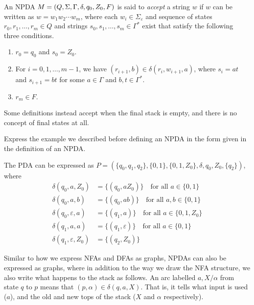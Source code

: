 \begin{definition}
An NPDA $M=(Q,\Sigma,\Gamma,\delta,q_0,Z_0,F)$ is said to \textit{accept} a string $w$ if $w$ can be written as $w=w_1w_2\cdots w_m$, where each $w_i\in\Sigma_\varepsilon$ and sequence of states $r_0,r_1,\ldots,r_m\in Q$ and strings $s_0,s_1,\ldots,s_m\in\Gamma^*$ exist that satisfy the following three conditions.
\begin{enumerate}
    \item $r_0=q_0$ and $s_0=Z_0$.
    \item For $i=0,1,\ldots,m-1$, we have $(r_{i+1},b)\in\delta(r_i,w_{i+1},a)$, where $s_i=at$ and $s_{i+1}=bt$ for some $a\in\Gamma$ and $b,t\in\Gamma^*$.
    \item $r_m\in F$.
\end{enumerate}
\end{definition}

Some definitions instead accept when the final stack is empty, and there is no concept of final states at all.

\begin{exercise}
\label{LwwRexercise}
Express the example we described before defining an NPDA in the form given in the definition of an NPDA.
\end{exercise}
\begin{solution}
The PDA can be expressed as $P=(\{q_0,q_1,q_2\}, \{0,1\}, \{0,1,Z_0\}, \delta, q_0,Z_0, \{q_2\})$, where
\begin{align*}
    \delta(q_0,a,Z_0) &= \{(q_0,aZ_0)\}\quad\text{for all $a\in\{0,1\}$} \\
    \delta(q_0,a,b) &= \{(q_0,ab)\}\quad\text{for all $a,b\in\{0,1\}$} \\
    \delta(q_0,\varepsilon,a) &= \{(q_1,a)\}\quad\text{for all $a\in\{0,1,Z_0\}$} \\
    \delta(q_1,a,a) &= \{(q_1,\varepsilon)\}\quad\text{for all $a\in\{0,1\}$} \\
    \delta(q_1,\varepsilon,Z_0) &= \{(q_2,Z_0)\}
\end{align*}
\end{solution}
    
\vspace{3mm}
Similar to how we express NFAs and DFAs as graphs, NPDAs can also be expressed as graphs, where in addition to the way we draw the NFA structure, we also write what happens to the stack as follows. An arc labelled $a,X/\alpha$ from state $q$ to $p$ means that $(p,\alpha)\in\delta(q,a,X)$. That is, it tells what input is used ($a$), and the old and new tops of the stack ($X$ and $\alpha$ respectively).

